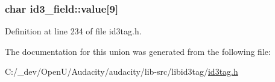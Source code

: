 \subsubsection[{\texorpdfstring{value}{value}}]{\setlength{\rightskip}{0pt plus 5cm}char id3\+\_\+field\+::value\mbox{[}9\mbox{]}}\hypertarget{unionid3__field_a53a4caa1334fbd4f92573b9363397e07}{}\label{unionid3__field_a53a4caa1334fbd4f92573b9363397e07}


Definition at line 234 of file id3tag.\+h.



The documentation for this union was generated from the following file\+:\begin{DoxyCompactItemize}
\item 
C\+:/\+\_\+dev/\+Open\+U/\+Audacity/audacity/lib-\/src/libid3tag/\hyperlink{id3tag_8h}{id3tag.\+h}\end{DoxyCompactItemize}
